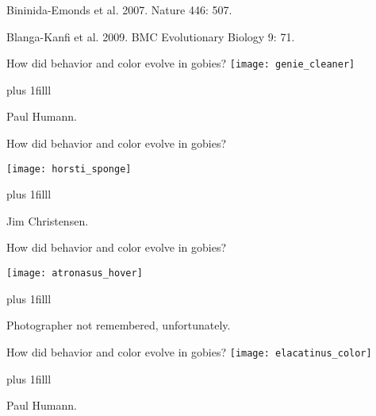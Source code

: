 \documentclass[t]{beamer}
\newcommand{\btVFill}{\vskip0pt plus 1filll}
\begin{document}
{
\begin{frame}[b]

\hfill\tiny Bininida-Emonds et al. 2007. Nature 446: 507.
\end{frame}
}
%
{
\begin{frame}[b]

\hfill\tiny Blanga-Kanfi et al. 2009. BMC Evolutionary Biology 9: 71.
\end{frame}
}
%
%
\begin{frame}[t]{How did behavior and color evolve in gobies?}
	\texttt{[image: genie\_cleaner]}
	
	\btVFill
	
	\hfill\tiny \textcopyright Paul Humann.
	
\end{frame}
%
\begin{frame}[t]{How did behavior and color evolve in gobies?}

	\vspace*{-0.5\baselineskip}
	
	\begin{center}
	
	\texttt{[image: horsti\_sponge]}
	
	\end{center}
	
	\btVFill
	
	\hfill\tiny \textcopyright Jim Christensen.
	
\end{frame}
%
\begin{frame}[t]{How did behavior and color evolve in gobies?}

	\vspace*{-0.5\baselineskip}
	
	\begin{center}
	
	\texttt{[image: atronasus\_hover]}
	
	\end{center}
	
	\btVFill
	
	\hfill\tiny Photographer not remembered, unfortunately.
	
\end{frame}
%
\begin{frame}[t]{How did behavior and color evolve in gobies?}
	\texttt{[image: elacatinus\_color]}
	
	\btVFill

	\hfill\tiny \textcopyright Paul Humann.
	
\end{frame}
\end{document}
